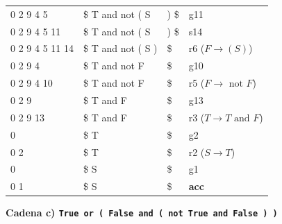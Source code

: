 \documentclass[12pt, letterpaper]{article}
\begin{document}
\begin{enumerate}
\begin{longtable}{p{3.6cm}p{4.0cm}p{4.5cm}>{\raggedright\arraybackslash}p{3.6cm}}
0 2 9 4 5 & \$ T and not ( S & ) \$ & g11 \\
0 2 9 4 5 11 & \$ T and not ( S & ) \$ & s14 \\
0 2 9 4 5 11 14 & \$ T and not ( S ) & \$ & r6 ($F \to ( S )$) \\
0 2 9 4 & \$ T and not F & \$ & g10 \\
0 2 9 4 10 & \$ T and not F & \$ & r5 ($F \to \text{ not } F$) \\
0 2 9 & \$ T and F & \$ & g13 \\
0 2 9 13 & \$ T and F & \$ & r3 ($T \to T \text{ and } F$) \\
0 & \$ T & \$ & g2 \\
0 2 & \$ T & \$ & r2 ($S \to T$) \\
0 & \$ S & \$ & g1 \\
0 1 & \$ S & \$ & \textbf{acc} \\
\bottomrule
\end{longtable}
\endgroup

\textbf{Cadena c) \texttt{True or ( False and ( not True and False ) )}}


\end{enumerate}
\end{document}
